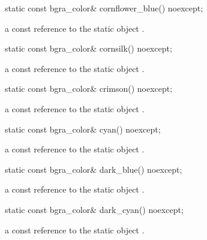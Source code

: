 \begin{itemdecl}
static const bgra_color& cornflower_blue() noexcept;
\end{itemdecl}
\begin{itemdescr}
\pnum
\returns
a const reference to the static  object .
\end{itemdescr}

\begin{itemdecl}
static const bgra_color& cornsilk() noexcept;
\end{itemdecl}
\begin{itemdescr}
\pnum
\returns
a const reference to the static  object .
\end{itemdescr}

\begin{itemdecl}
static const bgra_color& crimson() noexcept;
\end{itemdecl}
\begin{itemdescr}
\pnum
\returns
a const reference to the static  object .
\end{itemdescr}

\begin{itemdecl}
static const bgra_color& cyan() noexcept;
\end{itemdecl}
\begin{itemdescr}
\pnum
\returns
a const reference to the static  object .
\end{itemdescr}

\begin{itemdecl}
static const bgra_color& dark_blue() noexcept;
\end{itemdecl}
\begin{itemdescr}
\pnum
\returns
a const reference to the static  object .
\end{itemdescr}

\begin{itemdecl}
static const bgra_color& dark_cyan() noexcept;
\end{itemdecl}
\begin{itemdescr}
\pnum
\returns
a const reference to the static  object .
\end{itemdescr}

